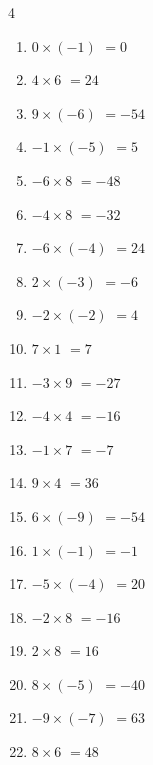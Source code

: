 \begin{multicols}{4}
\begin{enumerate}
  \item $0\times (-1)$
        $=0$

  \item $4\times 6$
        $=24$

\columnbreak %

  \item $9\times (-6)$
        $=-54$

  \item $-1\times (-5)$
        $=5$

  \item $-6\times 8$
        $=-48$

  \item $-4\times 8$
        $=-32$

  \item $-6\times (-4)$
        $=24$

  \item $2\times (-3)$
        $=-6$

  \item $-2\times (-2)$
        $=4$

  \item $7\times 1$
        $=7$

  \item $-3\times 9$
        $=-27$

  \item $-4\times 4$
        $=-16$

  \item $-1\times 7$
        $=-7$

  \item $9\times 4$
        $=36$

  \item $6\times (-9)$
        $=-54$

  \item $1\times (-1)$
        $=-1$

  \item $-5\times (-4)$
        $=20$

  \item $-2\times 8$
        $=-16$

  \item $2\times 8$
        $=16$

  \item $8\times (-5)$
        $=-40$

  \item $-9\times (-7)$
        $=63$

  \item $8\times 6$
        $=48$


\end{enumerate}
\end{multicols}
